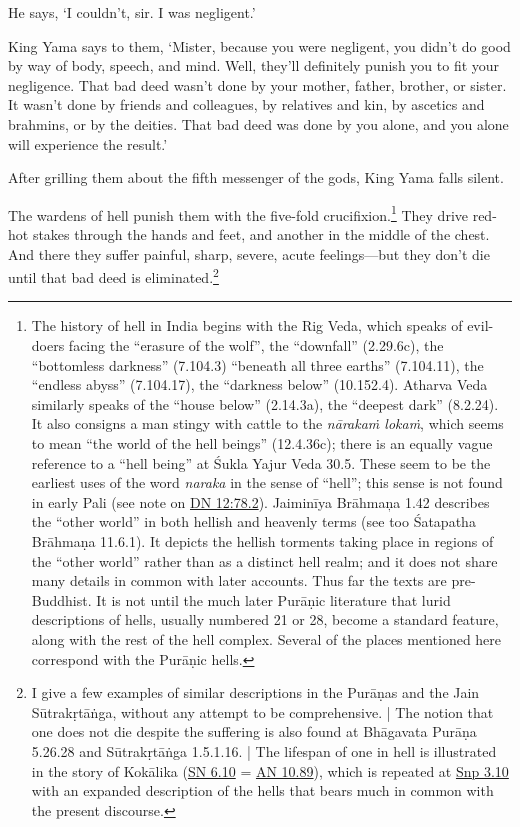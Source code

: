 \documentclass[12pt,openany]{book}%
\begin{document}
He says, ‘I couldn’t, sir. I was negligent.’ 

King Yama says to them, ‘Mister, because you were negligent, you didn’t do good by way of body, speech, and mind. Well, they’ll definitely punish you to fit your negligence. That bad deed wasn’t done by your mother, father, brother, or sister. It wasn’t done by friends and colleagues, by relatives and kin, by ascetics and brahmins, or by the deities. That bad deed was done by you alone, and you alone will experience the result.’ 

After grilling them about the fifth messenger of the gods, King Yama falls silent. 

The wardens of hell punish them with the five-fold crucifixion.\footnote{The history of hell in India begins with the Rig Veda, which speaks of evil-doers facing the “erasure of the wolf”, the “downfall” (2.29.6c), the “bottomless darkness” (7.104.3) “beneath all three earths” (7.104.11), the “endless abyss” (7.104.17), the “darkness below” (10.152.4). Atharva Veda similarly speaks of the “house below” (2.14.3a), the “deepest dark” (8.2.24). It also consigns a man stingy with cattle to the \textit{\textsanskrit{nārakaṁ} \textsanskrit{lokaṁ}}, which seems to mean “the world of the hell beings” (12.4.36c); there is an equally vague reference to a “hell being” at Śukla Yajur Veda 30.5. These seem to be the earliest uses of the word \textit{naraka} in the sense of “hell”; this sense is not found in early Pali (see note on \href{https://suttacentral.net/dn12/en/sujato\#78.2}{DN 12:78.2}). \textsanskrit{Jaiminīya} \textsanskrit{Brāhmaņa} 1.42 describes the “other world” in both hellish and heavenly terms (see too Śatapatha \textsanskrit{Brāhmaṇa} 11.6.1). It depicts the hellish torments taking place in regions of the “other world” rather than as a distinct hell realm; and it does not share many details in common with later accounts. Thus far the texts are pre-Buddhist. It is not until the much later \textsanskrit{Purāṇic} literature that lurid descriptions of hells, usually numbered 21 or 28, become a standard feature, along with the rest of the hell complex. Several of the places mentioned here correspond with the \textsanskrit{Purāṇic} hells. } They drive red-hot stakes through the hands and feet, and another in the middle of the chest. And there they suffer painful, sharp, severe, acute feelings—but they don’t die until that bad deed is eliminated.\footnote{I give a few examples of similar descriptions in the \textsanskrit{Purāṇas} and the Jain \textsanskrit{Sūtrakṛtāṅga}, without any attempt to be comprehensive. | The notion that one does not die despite the suffering is also found at \textsanskrit{Bhāgavata} \textsanskrit{Purāṇa} 5.26.28 and \textsanskrit{Sūtrakṛtāṅga} 1.5.1.16. | The lifespan of one in hell is illustrated in the story of \textsanskrit{Kokālika} (\href{https://suttacentral.net/sn6.10/en/sujato}{SN 6.10} = \href{https://suttacentral.net/an10.89/en/sujato}{AN 10.89}), which is repeated at \href{https://suttacentral.net/snp3.10/en/sujato}{Snp 3.10} with an expanded description of the hells that bears much in common with the present discourse. } 
\end{document}
